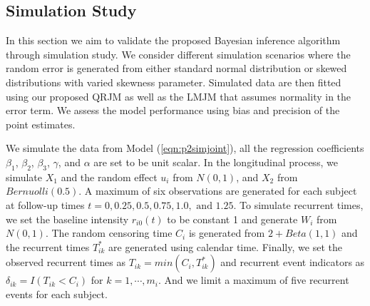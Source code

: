 







% 

\subsection{Simulation Study} \label{sec:p2simulation}
In this section we aim to validate the proposed Bayesian inference algorithm through simulation study. We consider different simulation scenarios where the random error is generated from either standard normal distribution or skewed distributions with varied skewness parameter. Simulated data are then fitted using our proposed QRJM as well as the LMJM that assumes normality in the error term. We assess the model performance using bias and precision of the point estimates.

We simulate the data from Model (\ref{eqn:p2simjoint}), all the regression coefficients $\beta_1$, $\beta_2$, $\beta_3$, $\gamma$, and $\alpha$ are set to be unit scalar. In the longitudinal process, we simulate $X_1$ and the random effect $u_i$ from $N(0, 1)$, and $X_2$ from $Bernuolli(0.5)$. A maximum of six observations are generated for each subject at follow-up times $t=0, 0.25, 0.5, 0.75, 1.0, \mbox{ and }1.25$. To simulate recurrent times, we set the baseline intensity $r_{i0}(t)$ to be constant 1 and generate $W_i$ from $N(0, 1)$. The random censoring time $C_i$ is generated from $2+Beta(1,1)$ and the recurrent times $T_{ik}^*$ are generated using calendar time. Finally, we set the observed recurrent times as $T_{ik} = min(C_i, T_{ik}^*)$ and recurrent event indicators as $\delta_{ik} = I(T_{ik} < C_i)$ for $k=1, \cdots, m_i$. And we limit a maximum of five recurrent events for each subject.



